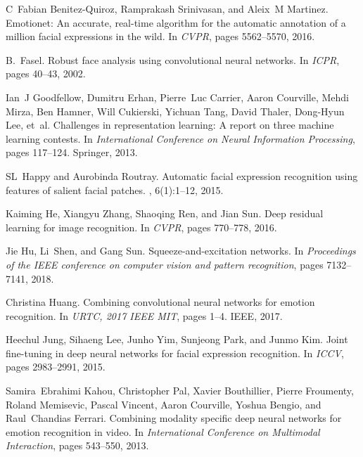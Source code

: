 \documentclass[journal]{IEEEtran}
\begin{document}
\begin{thebibliography}{10}
C~Fabian Benitez-Quiroz, Ramprakash Srinivasan, and Aleix~M Martinez.
\newblock Emotionet: An accurate, real-time algorithm for the automatic
annotation of a million facial expressions in the wild.
\newblock In {\em CVPR}, pages 5562--5570, 2016.

B.~Fasel.
\newblock Robust face analysis using convolutional neural networks.
\newblock In {\em ICPR}, pages 40--43, 2002.

Ian~J Goodfellow, Dumitru Erhan, Pierre~Luc Carrier, Aaron Courville, Mehdi
Mirza, Ben Hamner, Will Cukierski, Yichuan Tang, David Thaler, Dong-Hyun Lee,
et~al.
\newblock Challenges in representation learning: A report on three machine
learning contests.
\newblock In {\em International Conference on Neural Information Processing},
pages 117--124. Springer, 2013.

SL~Happy and Aurobinda Routray.
\newblock Automatic facial expression recognition using features of salient
facial patches.
, 6(1):1--12, 2015.

Kaiming He, Xiangyu Zhang, Shaoqing Ren, and Jian Sun.
\newblock Deep residual learning for image recognition.
\newblock In {\em CVPR}, pages 770--778, 2016.

Jie Hu, Li~Shen, and Gang Sun.
\newblock Squeeze-and-excitation networks.
\newblock In {\em Proceedings of the IEEE conference on computer vision and
	pattern recognition}, pages 7132--7141, 2018.

Christina Huang.
\newblock Combining convolutional neural networks for emotion recognition.
\newblock In {\em URTC, 2017 IEEE MIT}, pages 1--4. IEEE, 2017.

Heechul Jung, Sihaeng Lee, Junho Yim, Sunjeong Park, and Junmo Kim.
\newblock Joint fine-tuning in deep neural networks for facial expression
recognition.
\newblock In {\em ICCV}, pages 2983--2991, 2015.

Samira~Ebrahimi Kahou, Christopher Pal, Xavier Bouthillier, Pierre Froumenty,
Roland Memisevic, Pascal Vincent, Aaron Courville, Yoshua Bengio, and
Raul~Chandias Ferrari.
\newblock Combining modality specific deep neural networks for emotion
recognition in video.
\newblock In {\em International Conference on Multimodal Interaction}, pages
543--550, 2013.


\end{thebibliography}
\end{document}
